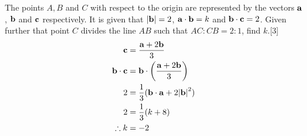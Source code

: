\documentclass[12pt, a4 paper]{article}
\begin{document}
\begin{outline}[enumerate]
	\color{black}
	\2 The points $A, B$ and $C$ with respect to the origin are represented by the vectors ${\bf{a}}$, ${\bf{b}}$ and ${\bf{c}}$ respectively. It is given that $\left| {\bf{b}} \right| = 2$, ${\bf{a}} \cdot {\bf{b}} = k$ and ${\bf{b}} \cdot {\bf{c}} = 2$. Given further that point $C$ divides the line $AB$ such that $AC:CB = 2:1$, find $k$.\hfill[3]
	\color{blue}
	\begin{align*}
		{\bf{c}}                & = \frac{{{\bf{a}} + 2{\bf{b}}}}{3}                                    \\
		{\bf{b}} \cdot {\bf{c}} & = {\bf{b}} \cdot \left( {\frac{{{\bf{a}} + 2{\bf{b}}}}{3}} \right)    \\
		2                       & = \frac{1}{3}({\bf{b}} \cdot {\bf{a}} + 2{\left| {\bf{b}} \right|^2}) \\
		2                       & = \frac{1}{3}(k + 8)                                                  \\
		\therefore k            & =  - 2                                                                
	\end{align*}
							        

\end{outline}
\end{document}
